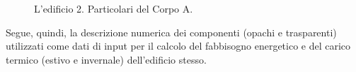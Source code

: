 \begin{figure}
	 \quad
	\caption{L'edificio 2. Particolari del Corpo A.}\label{esterno}
\end{figure}

Segue, quindi, la descrizione numerica dei componenti (opachi e trasparenti) utilizzati come dati di input per il calcolo del fabbisogno energetico e del carico termico (estivo e invernale) dell'edificio stesso.
